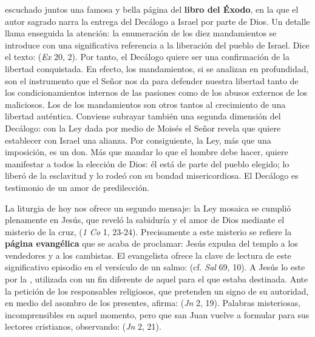 \begin{body}
 escuchado juntos una famosa y bella página del \textbf{libro del Éxodo}, en la que el autor sagrado narra la entrega del Decálogo a Israel por parte de Dios. Un detalle llama enseguida la atención: la enumeración de los diez mandamientos se introduce con una significativa referencia a la liberación del pueblo de Israel. Dice el texto:  (\textit{Ex} 20, 2). Por tanto, el Decálogo quiere ser una confirmación de la libertad conquistada. En efecto, los mandamientos, si se analizan en profundidad, son el instrumento que el Señor nos da para defender nuestra libertad tanto de los condicionamientos internos de las pasiones como de los abusos externos de los maliciosos. Los  de los mandamientos son otros tantos  al crecimiento de una libertad auténtica. Conviene subrayar también una segunda dimensión del Decálogo: con la Ley dada por medio de Moisés el Señor revela que quiere establecer con Israel una alianza. Por consiguiente, la Ley, más que una imposición, es un don. Más que mandar lo que el hombre debe hacer, quiere manifestar a todos la elección de Dios: él está de parte del pueblo elegido; lo liberó de la esclavitud y lo rodeó con su bondad misericordiosa. El Decálogo es testimonio de un amor de predilección.

La liturgia de hoy nos ofrece un segundo mensaje: la Ley mosaica se cumplió plenamente en Jesús, que reveló la sabiduría y el amor de Dios mediante el misterio de la cruz,  (\textit{1 Co} 1, 23-24). Precisamente a este misterio se refiere la \textbf{página evangélica} que se acaba de proclamar: Jesús expulsa del templo a los vendedores y a los cambistas. El evangelista ofrece la clave de lectura de este significativo episodio en el versículo de un salmo:  (cf. \textit{Sal} 69, 10). A Jesús lo  este  por la , utilizada con un fin diferente de aquel para el que estaba destinada. Ante la petición de los responsables religiosos, que pretenden un signo de su autoridad, en medio del asombro de los presentes, afirma:  (\textit{Jn} 2, 19). Palabras misteriosas, incomprensibles en aquel momento, pero que san Juan vuelve a formular para sus lectores cristianos, observando:  (\textit{Jn} 2, 21).


\end{body}
